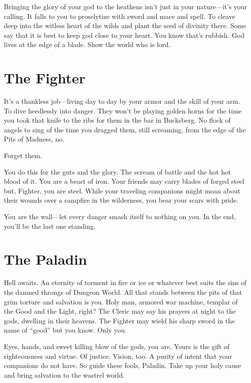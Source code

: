  

Bringing the glory of your god to the heathens isn't just in your nature—it's your calling. It falls to you to proselytize with sword and mace and spell. To cleave deep into the witless heart of the wilds and plant the seed of divinity there. Some say that it is best to keep god close to your heart. You know that’s rubbish. God lives at the edge of a blade. Show the world who is lord.

 
\section{The Fighter}   
 

It’s a thankless job—living day to day by your armor and the skill of your arm. To dive heedlessly into danger. They won’t be playing golden horns for the time you took that knife to the ribs for them in the bar in Bucksberg. No flock of angels to sing of the time you dragged them, still screaming, from the edge of the Pits of Madness, no.

 

Forget them.

 

You do this for the guts and the glory. The scream of battle and the hot hot blood of it. You are a beast of iron. Your friends may carry blades of forged steel but, Fighter, you are steel. While your traveling companions might moan about their wounds over a campfire in the wilderness, you bear your scars with pride.

 

You are the wall—let every danger smash itself to nothing on you. In the end, you’ll be the last one standing.

 
\section{The Paladin}   
 

Hell awaits. An eternity of torment in fire or ice or whatever best suits the sins of the damned throngs of Dungeon World. All that stands between the pits of that grim torture and salvation is you. Holy man, armored war machine, templar of the Good and the Light, right? The Cleric may say his prayers at night to the gods, dwelling in their heavens. The Fighter may wield his sharp sword in the name of “good” but you know. Only you.

 

Eyes, hands, and sweet killing blow of the gods, you are. Yours is the gift of righteousness and virtue. Of justice. Vision, too. A purity of intent that your companions do not have. So guide these fools, Paladin. Take up your holy cause and bring salvation to the wastrel world.

